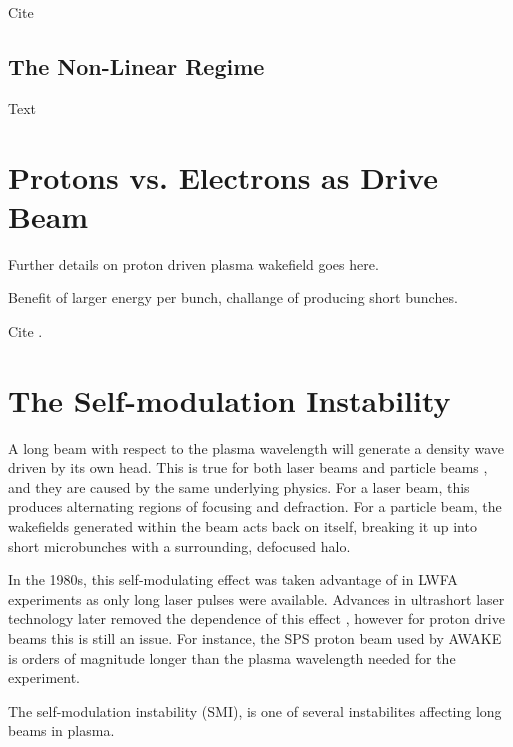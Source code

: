Cite \cite{ruth:1985}

\subsection{The Non-Linear Regime}
\label{Int:PWFA:NLin}

Text

\section{Protons vs. Electrons as Drive Beam}
\label{Int:PDPWFA}

Further details on proton driven plasma wakefield goes here.

Benefit of larger energy per bunch, challange of producing short bunches.

Cite \cite{adli:2016a}.

\section{The Self-modulation Instability}
\label{Int:SMI}

A long beam with respect to the plasma wavelength will generate a density wave driven by its own head. This is true for both laser beams \cite{esarey:1994} and particle beams \cite{kumar:2010}, and they are caused by the same underlying physics. For a laser beam, this produces alternating regions of focusing and defraction. For a particle beam, the wakefields generated within the beam acts back on itself, breaking it up into short microbunches with a surrounding, defocused halo.

In the 1980s, this self-modulating effect was taken advantage of in LWFA experiments as only long laser pulses were available. Advances in ultrashort laser technology later removed the dependence of this effect \cite{pukhov:2002}, however for proton drive beams this is still an issue. For instance, the SPS proton beam used by AWAKE is orders of magnitude longer than the plasma wavelength needed for the experiment.

The self-modulation instability (SMI), is one of several instabilites affecting long beams in plasma.

